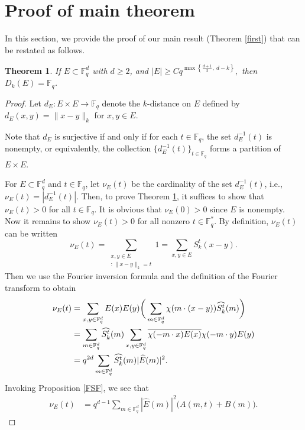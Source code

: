 \documentclass[a4paper,11pt]{amsart}
\numberwithin{equation}{section}
\newtheorem{theorem}{Theorem}[section]
\def\Fq#1{\mathbb{F}_q^{#1}}
\def\pnorm#1#2{|#2|_{#1}}
\def\knorm#1#2{\lVert#2\rVert_{#1}}
\begin{document}
\section{Proof of main theorem}\label{Ch4}   
In this section, we provide the proof of our main result (Theorem \ref{first}) that can be restated as follows.
\begin{theorem} \label{first*}
If $E \subset \mathbb{F}_q^d$ with $d \ge 2$, and 
$
|E| \ge C  q^{\max\left\{ \frac{d+1}{2},\ d - k \right\}},
$ then $D_k(E) = \mathbb{F}_q$.
\end{theorem}
\begin{proof}
Let \( d_E : E \times E \to \mathbb{F}_q \) denote the $k$-distance on $E$ defined by $
d_E(x,y) = \|x - y\|_{k}$ for $x,y \in E$.

Note that \( d_E \) is surjective if and only if for each \( t \in \mathbb{F}_q \), the set \( d_E^{-1}(t) \) is nonempty, or equivalently, the collection \( \{d_E^{-1}(t)\}_{t \in \mathbb{F}_q} \) forms a partition of \( E \times E \).

For $E \subset \Fq{d}$ and $t \in \Fq{}$, let $\nu_{E}(t)$ be the cardinality of the set $d_E^{-1}(t)$, i.e., $\nu_E(t)=\left|d_E^{-1} (t)\right|$. Then, to prove Theorem \ref{first*}, it suffices to show that $\nu_E(t) > 0$ for all  $t \in \Fq{}$. It is obvious that $\nu_E(0) > 0$ since $E$ is nonempty. Now it remains to  show  $\nu_E(t) > 0$
 for all nonzero $t \in \Fq{*}$.
By definition, $\nu_E(t)$ can be written
\begin{equation}\label{Nu}
\nu_{E}(t) = \sum_{\substack{{x,y\in E}\\{:\knorm{k}{x-y}=t}}}1 = \sum_{x,y\in E}S_{k}^t(x-y).
\end{equation}
Then we use  the Fourier inversion formula and the definition of the Fourier transform to obtain
\begin{align}\label{Nu1}
    \nu_E(t) & = \sum_{x,y \in \Fq{d}}E(x)E(y)\bigg{(}\sum_{m \in \Fq{d}}\chi(m\cdot(x-y))\widehat{S_{k}^t}(m)\bigg{)} \notag\\
    & = \sum_{m \in \Fq{d}} \widehat{S_{k}^t}(m) \sum_{x,y \in \Fq{d}}\overline{\chi(-m\cdot x)E(x)}\chi(-m\cdot y)E(y)\\
    & = q^{2d}\sum_{m\in\Fq{d}}\widehat{S_{k}^t}(m)|\widehat{E}(m)|^2.\notag
\end{align}
Invoking Proposition \ref{FSF},  we see that
 \begin{align}\label{AB}
\nu_{E}(t) &=q^{d-1}\sum_{m\in \Fq{d}}\pnorm{}{\widehat{E}(m)}^2\bigg(A(m,t)+B(m)
\bigg).
\end{align}


\end{proof}
\end{document}
